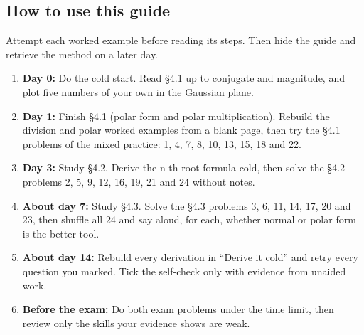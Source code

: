 \documentclass[11pt]{article}
\begin{document}
\begin{keepsection}
\section{How to use this guide}

Attempt each worked example before reading its steps. Then hide the guide and retrieve the method on a later day.

\begin{enumerate}
\item \textbf{Day 0:} Do the cold start. Read §4.1 up to conjugate and magnitude, and plot five numbers of your own in the Gaussian plane.
\item \textbf{Day 1:} Finish §4.1 (polar form and polar multiplication). Rebuild the division and polar worked examples from a blank page, then try the §4.1 problems of the mixed practice: 1, 4, 7, 8, 10, 13, 15, 18 and 22.
\item \textbf{Day 3:} Study §4.2. Derive the n-th root formula cold, then solve the §4.2 problems 2, 5, 9, 12, 16, 19, 21 and 24 without notes.
\item \textbf{About day 7:} Study §4.3. Solve the §4.3 problems 3, 6, 11, 14, 17, 20 and 23, then shuffle all 24 and say aloud, for each, whether normal or polar form is the better tool.
\item \textbf{About day 14:} Rebuild every derivation in “Derive it cold” and retry every question you marked. Tick the self-check only with evidence from unaided work.
\item \textbf{Before the exam:} Do both exam problems under the time limit, then review only the skills your evidence shows are weak.
\end{enumerate}
\end{keepsection}
\end{document}
